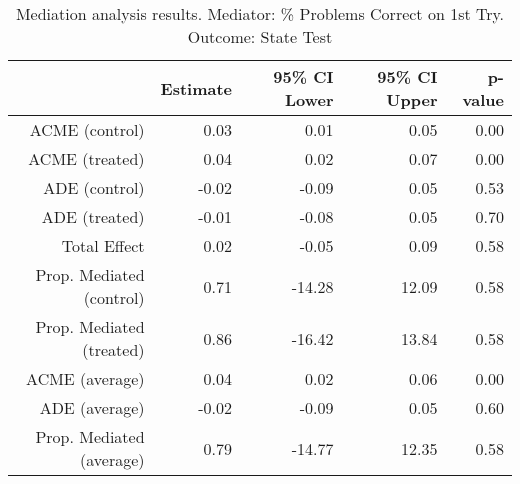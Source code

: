 \begin{table}[ht]
\centering
\begin{tabular}{rrrrr}
  \hline
 & Estimate & 95\% CI Lower & 95\% CI Upper & p-value \\ 
  \hline
ACME (control) & 0.03 & 0.01 & 0.05 & 0.00 \\ 
  ACME (treated) & 0.04 & 0.02 & 0.07 & 0.00 \\ 
  ADE (control) & -0.02 & -0.09 & 0.05 & 0.53 \\ 
  ADE (treated) & -0.01 & -0.08 & 0.05 & 0.70 \\ 
  Total Effect & 0.02 & -0.05 & 0.09 & 0.58 \\ 
  Prop. Mediated (control) & 0.71 & -14.28 & 12.09 & 0.58 \\ 
  Prop. Mediated (treated) & 0.86 & -16.42 & 13.84 & 0.58 \\ 
  ACME (average) & 0.04 & 0.02 & 0.06 & 0.00 \\ 
  ADE (average) & -0.02 & -0.09 & 0.05 & 0.60 \\ 
  Prop. Mediated (average) & 0.79 & -14.77 & 12.35 & 0.58 \\ 
   \hline
\end{tabular}
\caption{Mediation analysis results. Mediator: \% Problems Correct on 1st Try. Outcome: State Test} 
\end{table}

